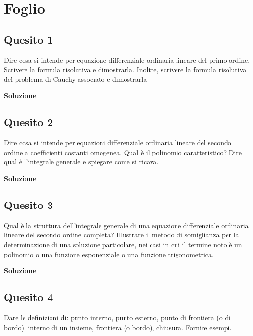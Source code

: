 \chapter{Foglio \ \thechapter}


\section*{Quesito 1}
Dire cosa si intende per equazione differenziale ordinaria lineare del primo
ordine. Scrivere la formula risolutiva e dimostrarla. Inoltre, scrivere la formula risolutiva
del problema di Cauchy associato e dimostrarla

\medskip
\begin{large}
\textbf{Soluzione}
\end{large}


\section*{Quesito 2}
Dire cosa si intende per equazioni differenziale ordinaria lineare del secondo
ordine a coefficienti costanti omogenea. Qual è il polinomio caratteristico? Dire qual è
l’integrale generale e spiegare come si ricava.



\medskip
\begin{large}
\textbf{Soluzione}
\end{large}


\section*{Quesito 3}
Qual è la struttura dell’integrale generale di una equazione differenziale ordinaria lineare del secondo ordine completa? Illustrare il metodo di somiglianza per la
determinazione di una soluzione particolare, nei casi in cui il termine noto è un polinomio
o una funzione esponenziale o una funzione trigonometrica.


\medskip
\begin{large}
\textbf{Soluzione}
\end{large}


\section*{Quesito 4}
Dare le definizioni di: punto interno, punto esterno, punto di frontiera (o di
bordo), interno di un insieme, frontiera (o bordo), chiusura. Fornire esempi.


